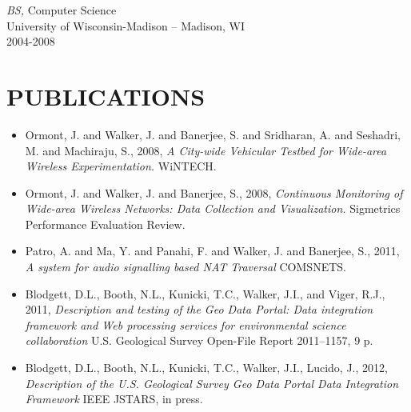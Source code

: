 \documentclass[line,margin]{res}
\begin{document}
\begin{resume}
		{\sl BS,} Computer Science \\
		University of Wisconsin-Madison -- Madison, WI \\
		2004-2008
  
\section{PUBLICATIONS}
	\begin{itemize} \itemsep -2pt
	 \item Ormont, J. and Walker, J. and Banerjee, S. and Sridharan, A. and Seshadri, M. and Machiraju, S., 2008, {\sl A City-wide Vehicular Testbed for Wide-area Wireless Experimentation.} WiNTECH.
    	 \item Ormont, J. and Walker, J. and Banerjee, S., 2008, {\sl Continuous Monitoring of Wide-area Wireless Networks: Data Collection and Visualization.} Sigmetrics Performance Evaluation Review.
	\item Patro, A. and Ma, Y. and Panahi, F. and Walker, J. and Banerjee, S., 2011, {\sl A system for audio signalling based NAT Traversal} COMSNETS.
	\item Blodgett, D.L., Booth, N.L., Kunicki, T.C., Walker, J.I., and Viger, R.J., 2011, {\sl Description and testing of the Geo Data Portal: Data integration framework and Web processing services for environmental science collaboration} U.S. Geological Survey Open-File Report 2011–1157, 9 p.
	\item Blodgett, D.L., Booth, N.L., Kunicki, T.C., Walker, J.I., Lucido, J., 2012, {\sl Description of the U.S. Geological Survey Geo Data Portal Data Integration Framework} IEEE JSTARS, in press.
	\end{itemize}

\end{resume}
\end{document}

